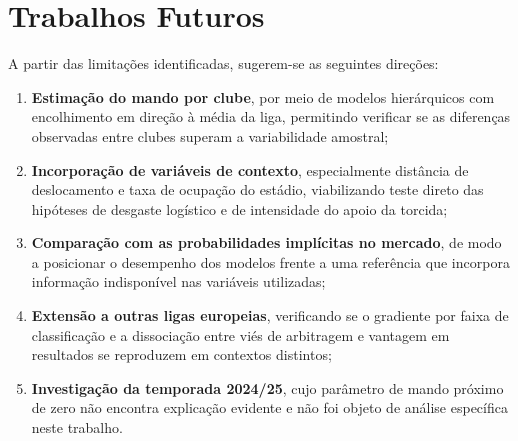 \section{Trabalhos Futuros}\label{sec:trabalhos-futuros}

A partir das limitações identificadas, sugerem-se as seguintes direções:

\begin{enumerate}
  \item \textbf{Estimação do mando por clube}, por meio de modelos hierárquicos
    com encolhimento em direção à média da liga, permitindo verificar se as
    diferenças observadas entre clubes superam a variabilidade amostral;
  \item \textbf{Incorporação de variáveis de contexto}, especialmente distância
    de deslocamento e taxa de ocupação do estádio, viabilizando teste direto das
    hipóteses de desgaste logístico e de intensidade do apoio da torcida;
  \item \textbf{Comparação com as probabilidades implícitas no mercado}, de modo
    a posicionar o desempenho dos modelos frente a uma referência que incorpora
    informação indisponível nas variáveis utilizadas;
  \item \textbf{Extensão a outras ligas europeias}, verificando se o gradiente
    por faixa de classificação e a dissociação entre viés de arbitragem e
    vantagem em resultados se reproduzem em contextos distintos;
  \item \textbf{Investigação da temporada 2024/25}, cujo parâmetro de mando
    próximo de zero não encontra explicação evidente e não foi objeto de análise
    específica neste trabalho.
\end{enumerate}
